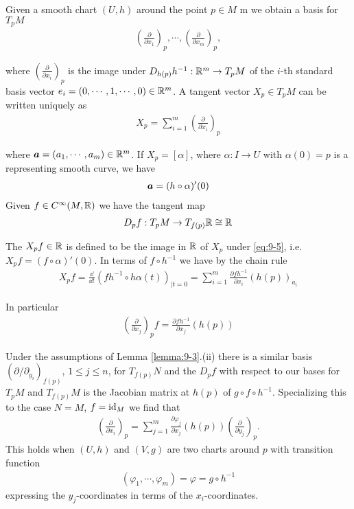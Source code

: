 \begin{remark}\label{remark:9-4}
  Given a smooth chart $(U, h)$ around the point $p\in M$ m we obtain
a basis for $T_pM$
\begin{align*}
  \left(\frac{\partial }{\partial x_1}\right)_p, \cdots,
  \left(\frac{\partial }{\partial x_m}\right)_p,
\end{align*}

where $(\frac{\partial }{\partial x_i})_p$ is the image under $D_{h(p)}h^{-1}:\mathbb{R}^m\to T_pM$ of the 
$i$-th standard basis vector $e_i = (0, \cdots, 1, \cdots, 0)\in\mathbb{R}^m$. A tangent vector $X_p\in T_pM$
can be written uniquely as 
\begin{align}\label{eq:9-4}
  X_p = \sum_{i=1}^{m }{\left(\frac{\partial }{\partial x_i }\right)_p}
\end{align}

where $\bm{a}=(a_1, \cdots, a_m)\in\mathbb{R}^m$. If $X_p = [\alpha]$, where $\alpha:I\to U$ with $\alpha(0)=p$ is 
a representing smooth curve, we have 
\begin{align*}
  \bm{a} = (h\circ \alpha)'(0)
\end{align*}
Given $f\in C^\infty(M, \mathbb{R})$ we have the tangent map 
\begin{align}\label{eq:9-5}
  D_pf:T_pM\to T_{f(p)}\mathbb{R}\cong \mathbb{R}
\end{align}

The  $X_pf\in\mathbb{R}$ is defined to be the image in $\mathbb{R}$ of $X_p$ under
\eqref{eq:9-5}, i.e. $X_pf = (f\circ \alpha)'(0)$. In terms of $f\circ h^{-1}$ we have by the 
chain rule
\begin{align*}
  X_pf = \frac{\dd }{\dd t}\left(fh^{-1}\circ h\alpha(t)\right)_{|t=0}
    = \sum_{i=1}^{m }{\frac{\partial fh^{-1}}{\partial x_i} (h(p))_{a_i}}
\end{align*}

In particular
\begin{align}\label{eq:9-6}
  \left(\frac{\partial }{\partial x_j}\right)_p f 
  = \frac{\partial fh^{-1}}{\partial x_j}(h(p))
\end{align}

Under the assumptions of Lemma \ref{lemma:9-3}.(ii) there is a similar basis 
$(\partial/\partial_{y_i})_{f(p)}$, $1\le j\le n$, for $T_{f(p)}N$ and the $D_pf$ with 
respect to our bases for $T_pM$ and $T_{f(p)}M$ is the Jacobian matrix at $h(p)$ of $g\circ f\circ h^{-1}$.
Specializing this to the case $N=M$, $f=\operatorname{id}_M$ we find that 
\begin{align}\label{eq:9-7}
  \left(\frac{\partial }{\partial x_i}\right)_p 
  = \sum_{j=1}^{m }{\frac{\partial \varphi_j }{\partial x_j } (h(p))\left(\frac{\partial }{\partial y_j}\right)_p}.
\end{align}
This holds when $(U, h)$ and $(V, g)$ are two charts around $p$ with transition function
\begin{align*}
  (\varphi_1, \cdots, \varphi_m)
  = \varphi
  = g\circ h^{-1}
\end{align*}
expressing the $y_j$-coordinates in terms of the $x_i$-coordinates.
\end{remark}

